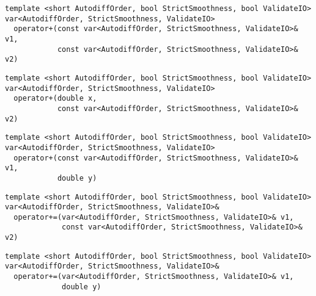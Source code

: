 \begin{tcolorbox}[colback=white,colframe=gray90, coltitle=black,boxrule=3pt,
fonttitle=\bfseries,title= Operator Addition]

\begin{verbatim}
template <short AutodiffOrder, bool StrictSmoothness, bool ValidateIO>
var<AutodiffOrder, StrictSmoothness, ValidateIO>
  operator+(const var<AutodiffOrder, StrictSmoothness, ValidateIO>& v1,
            const var<AutodiffOrder, StrictSmoothness, ValidateIO>& v2)

\end{verbatim}

\begin{verbatim}
template <short AutodiffOrder, bool StrictSmoothness, bool ValidateIO>
var<AutodiffOrder, StrictSmoothness, ValidateIO>
  operator+(double x,
            const var<AutodiffOrder, StrictSmoothness, ValidateIO>& v2)

\end{verbatim}

\begin{verbatim}
template <short AutodiffOrder, bool StrictSmoothness, bool ValidateIO>
var<AutodiffOrder, StrictSmoothness, ValidateIO>
  operator+(const var<AutodiffOrder, StrictSmoothness, ValidateIO>& v1,
            double y)

\end{verbatim}

\end{tcolorbox}

\begin{tcolorbox}[colback=white,colframe=gray90, coltitle=black,boxrule=3pt,
fonttitle=\bfseries,title= Operator Addition Assignment]

\begin{verbatim}
template <short AutodiffOrder, bool StrictSmoothness, bool ValidateIO>
var<AutodiffOrder, StrictSmoothness, ValidateIO>&
  operator+=(var<AutodiffOrder, StrictSmoothness, ValidateIO>& v1,
             const var<AutodiffOrder, StrictSmoothness, ValidateIO>& v2)

\end{verbatim}

\begin{verbatim}
template <short AutodiffOrder, bool StrictSmoothness, bool ValidateIO>
var<AutodiffOrder, StrictSmoothness, ValidateIO>&
  operator+=(var<AutodiffOrder, StrictSmoothness, ValidateIO>& v1,
             double y)

\end{verbatim}

\end{tcolorbox}

